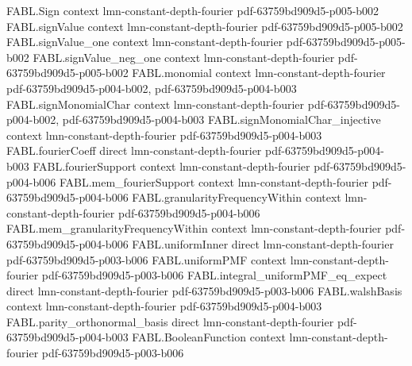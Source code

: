 \begin{theorem}[Parseval]
\label{FABL.FiniteFourierBasis.parseval}
\leanok
{}
\proofstep
  {FABL.Sign}
  {context}
  {lmn-constant-depth-fourier}
  {pdf-63759bd909d5-p005-b002}
\proofstep
  {FABL.signValue}
  {context}
  {lmn-constant-depth-fourier}
  {pdf-63759bd909d5-p005-b002}
\proofstep
  {FABL.signValue_one}
  {context}
  {lmn-constant-depth-fourier}
  {pdf-63759bd909d5-p005-b002}
\proofstep
  {FABL.signValue_neg_one}
  {context}
  {lmn-constant-depth-fourier}
  {pdf-63759bd909d5-p005-b002}
\proofstep
  {FABL.monomial}
  {context}
  {lmn-constant-depth-fourier}
  {pdf-63759bd909d5-p004-b002,
    pdf-63759bd909d5-p004-b003}
\proofstep
  {FABL.signMonomialChar}
  {context}
  {lmn-constant-depth-fourier}
  {pdf-63759bd909d5-p004-b002,
    pdf-63759bd909d5-p004-b003}
\proofstep
  {FABL.signMonomialChar_injective}
  {context}
  {lmn-constant-depth-fourier}
  {pdf-63759bd909d5-p004-b003}
\proofstep
  {FABL.fourierCoeff}
  {direct}
  {lmn-constant-depth-fourier}
  {pdf-63759bd909d5-p004-b003}
\proofstep
  {FABL.fourierSupport}
  {context}
  {lmn-constant-depth-fourier}
  {pdf-63759bd909d5-p004-b006}
\proofstep
  {FABL.mem_fourierSupport}
  {context}
  {lmn-constant-depth-fourier}
  {pdf-63759bd909d5-p004-b006}
\proofstep
  {FABL.granularityFrequencyWithin}
  {context}
  {lmn-constant-depth-fourier}
  {pdf-63759bd909d5-p004-b006}
\proofstep
  {FABL.mem_granularityFrequencyWithin}
  {context}
  {lmn-constant-depth-fourier}
  {pdf-63759bd909d5-p004-b006}
\proofstep
  {FABL.uniformInner}
  {direct}
  {lmn-constant-depth-fourier}
  {pdf-63759bd909d5-p003-b006}
\proofstep
  {FABL.uniformPMF}
  {context}
  {lmn-constant-depth-fourier}
  {pdf-63759bd909d5-p003-b006}
\proofstep
  {FABL.integral_uniformPMF_eq_expect}
  {direct}
  {lmn-constant-depth-fourier}
  {pdf-63759bd909d5-p003-b006}
\proofstep
  {FABL.walshBasis}
  {context}
  {lmn-constant-depth-fourier}
  {pdf-63759bd909d5-p004-b003}
\proofstep
  {FABL.parity_orthonormal_basis}
  {direct}
  {lmn-constant-depth-fourier}
  {pdf-63759bd909d5-p004-b003}
\proofstep
  {FABL.BooleanFunction}
  {context}
  {lmn-constant-depth-fourier}
  {pdf-63759bd909d5-p003-b006}

\end{theorem}
